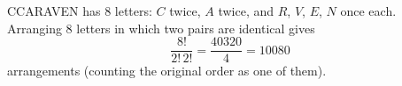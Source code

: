 CCARAVEN has $8$ letters: $C$ twice, $A$ twice, and $R$, $V$, $E$, $N$ once each. Arranging $8$ letters in which two pairs are identical gives
\[\dfrac{8!}{2!\,2!}=\dfrac{40320}{4}=\boxed{10080}\]
arrangements (counting the original order as one of them).
